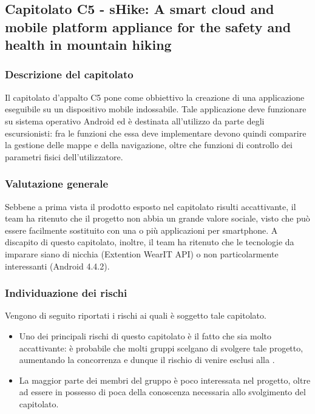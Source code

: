 	\subsection{Capitolato C5 - sHike: A smart cloud and mobile platform appliance for the safety and health in mountain hiking}
		\subsubsection{Descrizione del capitolato}
			Il capitolato d'appalto C5 pone come obbiettivo la creazione di una applicazione eseguibile su un dispositivo mobile indossabile. Tale applicazione deve funzionare su sistema operativo Android ed è destinata all'utilizzo da parte degli escursionisti: fra le funzioni che essa deve implementare devono quindi comparire la gestione delle mappe e della navigazione, oltre che funzioni di controllo dei parametri fisici dell'utilizzatore.
		\subsubsection{Valutazione generale}
		Sebbene a prima vista il prodotto esposto nel capitolato risulti accattivante, il team ha ritenuto che il progetto non abbia un grande valore sociale, visto che può essere facilmente sostituito con una o più applicazioni per smartphone. A discapito di questo capitolato, inoltre, il team ha ritenuto che le tecnologie da imparare siano di nicchia (Extention WearIT API) o non particolarmente interessanti (Android 4.4.2).
		\subsubsection{Individuazione dei rischi}
			Vengono di seguito riportati i rischi ai quali è soggetto tale capitolato.
			\begin{itemize}
				\item Uno dei principali rischi di questo capitolato è il fatto che sia molto accattivante: è probabile che molti gruppi scelgano di svolgere tale progetto, aumentando la concorrenza e dunque il rischio di venire esclusi alla .
				\item La maggior parte dei membri del gruppo è poco interessata nel progetto, oltre ad essere in possesso di poca della conoscenza necessaria allo svolgimento del capitolato.
			\end{itemize}
